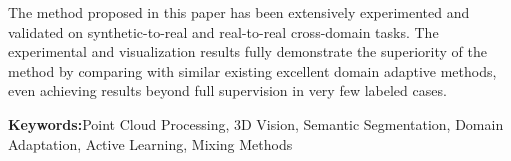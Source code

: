 The method proposed in this paper has been extensively experimented and validated on synthetic-to-real and real-to-real cross-domain tasks. The experimental and visualization results fully demonstrate the superiority of the method by comparing with similar existing excellent domain adaptive methods, even achieving results beyond full supervision in very few labeled cases.

\noindent\textbf{Keywords:}Point Cloud Processing, 3D Vision, Semantic Segmentation,  Domain Adaptation, Active Learning, Mixing Methods

\clearpage